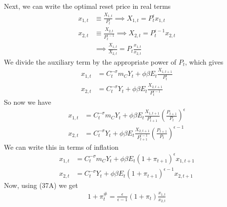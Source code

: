 \documentclass[twocolumn, fleqn]{article}
\begin{document}
	Next, we can write the optimal reset price in real terms 
	\begin{align*}
		x_{1,t} &\equiv \frac{X_{1,t}}{P_t^\epsilon} \implies X_{1,t} = P_t^\epsilon x_{1,t}\\
		x_{2,t} &\equiv \frac{X_{2,t}}{P_t^{\epsilon-1}} \implies X_{2,t} = P_t^{\epsilon-1} x_{2,t}\\
		&\implies \frac{X_{1,t}}{X_{2,t}} = P_t \frac{x_{1,t}}{x_{2,t}} \tag{37A}
	\end{align*}
	We divide the auxiliary term by the appropriate power of $P_t$, which gives 
	\begin{align*}
		x_{1,t} &= C_t^{-\sigma} m_C Y_t + \phi \beta E_t \frac{X_{1,t+1}}{P_t^\epsilon} \\
		x_{2,t} &= C_t^{-\sigma} Y_t + \phi \beta E_t \frac{X_{2,t+1}}{P_t^{\epsilon-1}}
	\end{align*}
	So now we have
	\begin{align*}
		x_{1,t} &= C_t^{-\sigma} m_C Y_t + \phi \beta E_t \frac{X_{1,t+1}}{P_{t+1}^\epsilon} \left( \frac{P_{t+1}}{P_t} \right)^\epsilon \\
		x_{2,t} &= C_t^{-\sigma} Y_t + \phi \beta E_t \frac{X_{2,t+1}}{P_{t+1}^{\epsilon-1}} \left( \frac{P_{t+1}}{P_t} \right)^{\epsilon-1}
	\end{align*}
	We can write this in terms of inflation
	\begin{align}
		x_{1,t} &= C_t^{-\sigma} m_C Y_t + \phi \beta E_t (1 + \pi_{t+1})^{\epsilon} x_{1,t+1} \\
		x_{2,t} &= C_t^{-\sigma} Y_t + \phi \beta E_t (1 + \pi_{t+1})^{\epsilon-1} x_{2,t+1}
	\end{align}
	Now, using (37A) we get 
	\begin{align}
	1 + \pi_t^{\#} = \frac{\epsilon}{\epsilon - 1} (1 + \pi_t) \frac{x_{1,t}}{x_{2,t}}
	\end{align}
	
\end{document}
